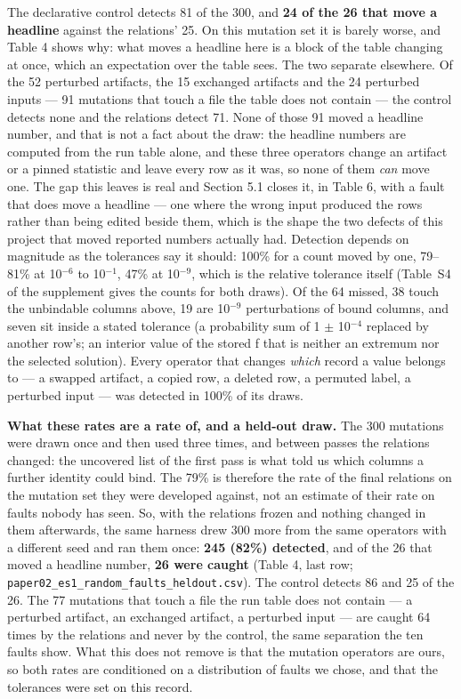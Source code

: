 \documentclass[acmsmall,screen,review]{acmart}
\begin{document}
The declarative control detects 81 of the 300, and \textbf{24 of the 26 that move a headline} against the relations' 25. On this mutation set it is barely worse, and Table 4 shows why: what moves a headline here is a block of the table changing at once, which an expectation over the table sees. The two separate elsewhere. Of the 52 perturbed artifacts, the 15 exchanged artifacts and the 24 perturbed inputs --- 91 mutations that touch a file the table does not contain --- the control detects none and the relations detect 71. None of those 91 moved a headline number, and that is not a fact about the draw: the headline numbers are computed from the run table alone, and these three operators change an artifact or a pinned statistic and leave every row as it was, so none of them \textit{can} move one. The gap this leaves is real and Section 5.1 closes it, in Table 6, with a fault that does move a headline --- one where the wrong input produced the rows rather than being edited beside them, which is the shape the two defects of this project that moved reported numbers actually had. Detection depends on magnitude as the tolerances say it should: 100\% for a count moved by one, 79--81\% at 10$^{-6}$ to 10$^{-1}$, 47\% at 10$^{-9}$, which is the relative tolerance itself (Table~S4 of the supplement gives the counts for both draws). Of the 64 missed, 38 touch the unbindable columns above, 19 are 10$^{-9}$ perturbations of bound columns, and seven sit inside a stated tolerance (a probability sum of 1 $\pm$ 10$^{-4}$ replaced by another row's; an interior value of the stored f that is neither an extremum nor the selected solution). Every operator that changes \textit{which} record a value belongs to --- a swapped artifact, a copied row, a deleted row, a permuted label, a perturbed input --- was detected in 100\% of its draws.


\textbf{What these rates are a rate of, and a held-out draw.} The 300 mutations were drawn once and then used three times, and between passes the relations changed: the uncovered list of the first pass is what told us which columns a further identity could bind. The 79\% is therefore the rate of the final relations on the mutation set they were developed against, not an estimate of their rate on faults nobody has seen. So, with the relations frozen and nothing changed in them afterwards, the same harness drew 300 more from the same operators with a different seed and ran them once: \textbf{245 (82\%) detected}, and of the 26 that moved a headline number, \textbf{26 were caught} (Table 4, last row; \texttt{paper02\_\allowbreak{}es1\_\allowbreak{}random\_\allowbreak{}faults\_\allowbreak{}heldout.\allowbreak{}csv}). The control detects 86 and 25 of the 26. The 77 mutations that touch a file the run table does not contain --- a perturbed artifact, an exchanged artifact, a perturbed input --- are caught 64 times by the relations and never by the control, the same separation the ten faults show. What this does not remove is that the mutation operators are ours, so both rates are conditioned on a distribution of faults we chose, and that the tolerances were set on this record.
\end{document}

